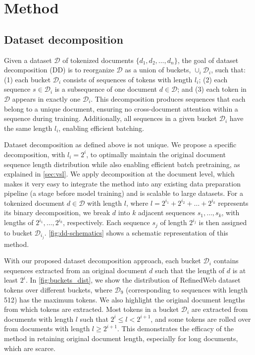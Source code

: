 \section{Method}
\subsection{Dataset decomposition}\label{sec:dd}
Given a dataset $\mathcal{D}$ of tokenized documents $\{d_1, d_2, \ldots, d_n\}$, the goal of dataset decomposition (DD) is to reorganize $\mathcal{D}$ as a union of buckets, $\cup_i \mathcal{D}_i$, such that: (1) each bucket $\mathcal{D}_i$ consists of sequences of tokens with length $l_i$; (2) each sequence $s \in \mathcal{D}_i$ is a subsequence of one document $d \in \mathcal{D}$; and (3) each token in $\mathcal{D}$ appears in exactly one $\mathcal{D}_i$. This decomposition produces sequences that each belong to a unique document, ensuring no cross-document attention within a sequence during training. Additionally, all sequences in a given bucket $\mathcal{D}_i$ have the same length $l_i$, enabling efficient batching.

Dataset decomposition as defined above is not unique. We propose a specific decomposition, with $l_i = 2^i$, to optimally maintain the original document sequence length distribution while also enabling efficient batch pretraining, as explained in \cref{sec:vsl}. We apply decomposition at the document level, which makes it very easy to integrate the method into any existing data preparation pipeline (a stage before model training) and is scalable to large datasets. For a tokenized document $d \in \mathcal{D}$ with length $l$, where $l=2^{i_1} + 2^{i_2} + \ldots + 2^{i_k}$ represents its binary decomposition, we break $d$ into $k$ adjacent sequences $s_1, \ldots, s_k$, with lengths of $2^{i_1}, \ldots, 2^{i_k}$, respectively. Each sequence $s_j$ of length $2^{i_j}$ is then assigned to bucket $\mathcal{D}_{i_j}$. \cref{fig:dd-schematics} shows a schematic representation of this method.

With our proposed dataset decomposition approach, each bucket $\mathcal{D}_i$ contains sequences extracted from an original document $d$ such that the length of $d$ is at least $2^i$. In \cref{fig:buckets_dist}, we show the distribution of RefinedWeb dataset tokens over different buckets, where $\mathcal{D}_9$ (corresponding to sequences with length 512) has the maximum tokens. We also highlight the original document lengths from which tokens are extracted. Most tokens in a bucket $\mathcal{D}_i$ are extracted from documents with length $l$ such that $2^i \le l < 2^{i+1}$, and some tokens are rolled over from documents with length $l \ge 2^{i+1}$. This demonstrates the efficacy of the method in retaining original document length, especially for long documents, which are scarce.

